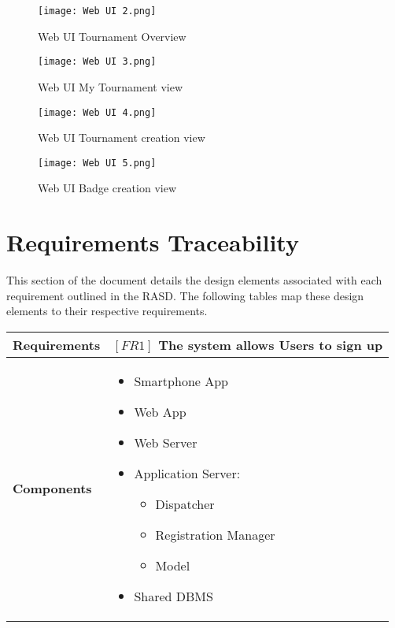 \documentclass{article}
\begin{document}
\begin{figure}[H]
    \centering
    \texttt{[image: Web UI 2.png]}
    \caption{Web UI Tournament Overview}
\end{figure}

\begin{figure}[H]
    \centering
    \texttt{[image: Web UI 3.png]}
    \caption{Web UI My Tournament view}
\end{figure}

\begin{figure}[H]
    \centering
    \texttt{[image: Web UI 4.png]}
    \caption{Web UI Tournament creation view}
\end{figure}

\begin{figure}[H]
    \centering
    \texttt{[image: Web UI 5.png]}
    \caption{Web UI Badge creation view}
\end{figure}
\newpage
\section{Requirements Traceability}
This section of the document details the design elements associated with each requirement outlined in the RASD. The following tables map these design elements to their respective requirements. \\

\begin{table}[H]
 \renewcommand{\arraystretch}{1.5}
    \centering
    \begin{tabular}{|l|p{10cm}|}
        \hline
        \textbf{Requirements} & $[FR1]$ The system allows Users to sign up \\
        \hline
        \textbf{Components} & 
        \begin{itemize}[align=left, topsep=0pt, partopsep=0pt]
            \item Smartphone App
            \item Web App
            \item Web Server
            \item Application Server:
            \begin{itemize}
                \item Dispatcher
                \item Registration Manager
                \item Model
            \end{itemize}
            \item Shared DBMS 
        \end{itemize} \\
        \hline
    \end{tabular}
\end{table}
\end{document}
